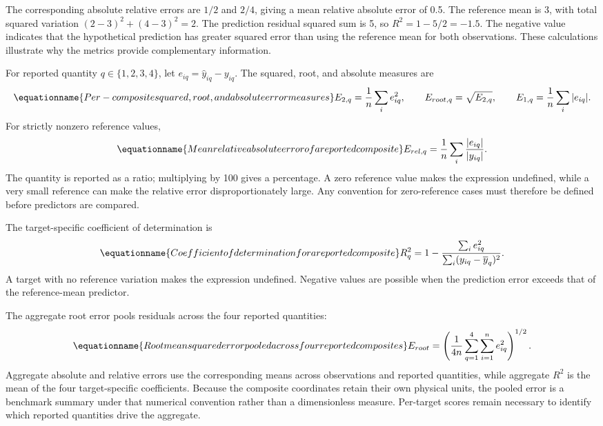 The corresponding absolute relative errors are \(1/2\) and \(2/4\), giving a mean relative absolute error of 0.5. The reference mean is 3, with total squared variation \((2-3)^2+(4-3)^2=2\). The prediction residual squared sum is 5, so \(R^2=1-5/2=-1.5\). The negative value indicates that the hypothetical prediction has greater squared error than using the reference mean for both observations. These calculations illustrate why the metrics provide complementary information.

For reported quantity \(q\in\{1,2,3,4\}\), let \(e_{iq}=\widehat y_{iq}-y_{iq}\). The squared, root, and absolute measures are
\begin{equation}
\equationname{Per-composite squared, root, and absolute error measures}
\label{eq:icsor_composite_error_metrics}
E_{2,q}=\frac{1}{n}\sum_i e_{iq}^{2},
\qquad E_{root,q}=\sqrt{E_{2,q}},
\qquad E_{1,q}=\frac{1}{n}\sum_i|e_{iq}|.
\end{equation}
For strictly nonzero reference values,
\begin{equation}
\equationname{Mean relative absolute error of a reported composite}
\label{eq:icsor_relative_error}
E_{rel,q}=\frac{1}{n}\sum_i\frac{|e_{iq}|}{|y_{iq}|}.
\end{equation}
The quantity is reported as a ratio; multiplying by 100 gives a percentage. A zero reference value makes the expression undefined, while a very small reference can make the relative error disproportionately large. Any convention for zero-reference cases must therefore be defined before predictors are compared.

The target-specific coefficient of determination is
\begin{equation}
\equationname{Coefficient of determination for a reported composite}
\label{eq:icsor_coefficient_determination}
R_q^2=1-
\frac{\sum_i e_{iq}^{2}}
{\sum_i(y_{iq}-\overline y_q)^2}.
\end{equation}
A target with no reference variation makes the expression undefined. Negative values are possible when the prediction error exceeds that of the reference-mean predictor.

The aggregate root error pools residuals across the four reported quantities:
\begin{equation}
\equationname{Root mean squared error pooled across four reported composites}
\label{eq:icsor_aggregate_root_error}
E_{root}=\left(\frac{1}{4n}\sum_{q=1}^{4}\sum_{i=1}^{n}e_{iq}^{2}\right)^{1/2}.
\end{equation}
Aggregate absolute and relative errors use the corresponding means across observations and reported quantities, while aggregate \(R^2\) is the mean of the four target-specific coefficients. Because the composite coordinates retain their own physical units, the pooled error is a benchmark summary under that numerical convention rather than a dimensionless measure. Per-target scores remain necessary to identify which reported quantities drive the aggregate.

